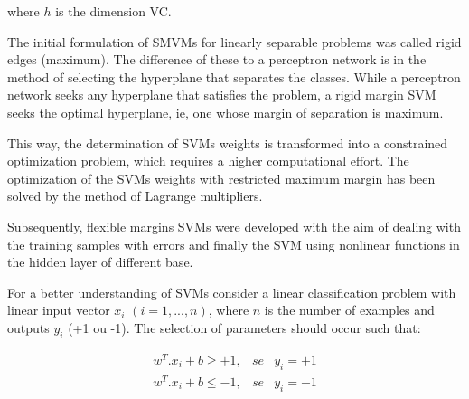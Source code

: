 where $h$ is the dimension VC.

The initial formulation of SMVMs for linearly separable problems was called rigid edges (maximum). The difference of these to a perceptron network is in the method of selecting the hyperplane that separates the classes. While a perceptron network seeks any hyperplane that satisfies the problem, a rigid margin SVM seeks the optimal hyperplane, ie, one whose margin of separation is maximum.

This way, the determination of SVMs weights is transformed into a constrained optimization problem, which requires a higher computational effort. The optimization of the SVMs weights with restricted maximum margin has been solved by the method of Lagrange multipliers.

Subsequently, flexible margins SVMs were developed with the aim of dealing with the training samples with errors and finally the SVM using nonlinear functions in the hidden layer of different base.

For a better understanding of SVMs consider a linear classification problem with linear input vector  $x_i$ $(i=1,...,n)$, where $n$ is the number of examples and outputs $y_i$ (+1 ou -1). The selection of parameters should occur such that:

\begin{eqnarray}
\label{eq:svm_example}
w^T.x_i + b \geq +1 ,& se& y_i= +1 \\
w^T.x_i + b \leq -1 ,& se& y_i= -1 
\end{eqnarray}

